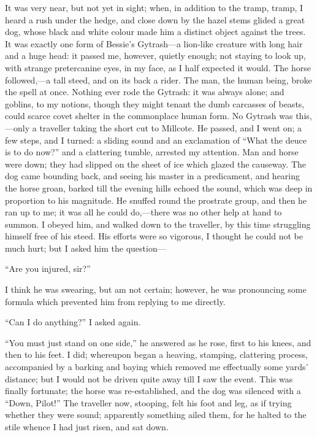 It was very near, but not yet in sight; when, in addition to the tramp,
tramp, I heard a rush under the hedge, and close down by the hazel stems
glided a great dog, whose black and white colour made him a distinct
object against the trees. It was exactly one form of Bessie's
Gytrash---a lion-like creature with long hair and a huge head: it passed
me, however, quietly enough; not staying to look up, with strange
pretercanine eyes, in my face, as I half expected it would. The horse
followed,---a tall steed, and on its back a rider. The man, the human
being, broke the spell at once. Nothing ever rode the Gytrash: it was
always alone; and goblins, to my notions, though they might tenant the
dumb carcasses of beasts, could scarce covet shelter in the commonplace
human form. No Gytrash was this,---only a traveller taking the short
cut to Millcote. He passed, and I went on; a few steps, and I turned: a
sliding sound and an exclamation of \enquote{What the deuce is to do
	now?} and a clattering tumble, arrested my attention. Man and horse
were down; they had slipped on the sheet of ice which glazed the
causeway. The dog came bounding back, and seeing his master in a
predicament, and hearing the horse groan, barked till the evening hills
echoed the sound, which was deep in proportion to his magnitude. He
snuffed round the prostrate group, and then he ran up to me; it was all
he could do,---there was no other help at hand to summon. I obeyed him,
and walked down to the traveller, by this time struggling himself free
of his steed. His efforts were so vigorous, I thought he could not be
much hurt; but I asked him the question---

\enquote{Are you injured, sir?}

I think he was swearing, but am not certain; however, he was pronouncing
some formula which prevented him from replying to me directly.

\enquote{Can I do anything?} I asked again.

\enquote{You must just stand on one side,} he answered as he rose, first
to his knees, and then to his feet. I did; whereupon began a heaving,
stamping, clattering process, accompanied by a barking and baying which
removed me effectually some yards' distance; but I would not be driven
quite away till I saw the event. This was finally fortunate; the horse
was re-established, and the dog was silenced with a \enquote{Down,
	Pilot!} The traveller now, stooping, felt his foot and leg, as if
trying whether they were sound; apparently something ailed them, for he
halted to the stile whence I had just risen, and sat down.

